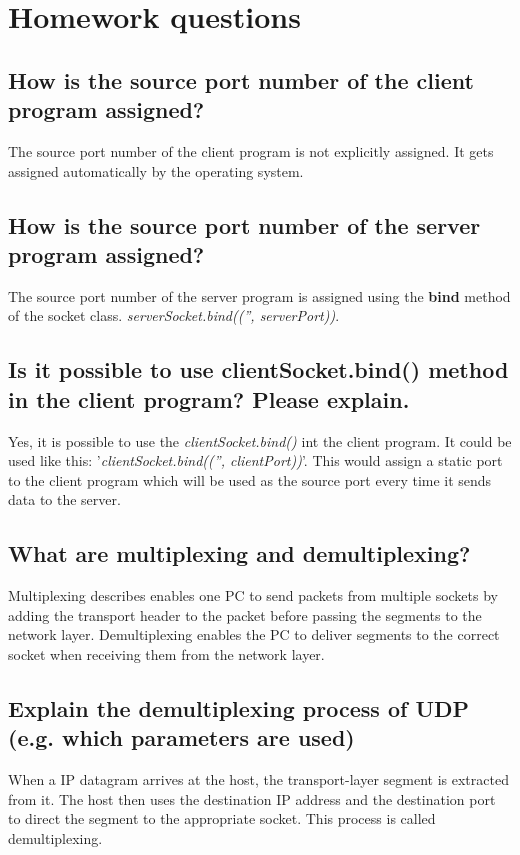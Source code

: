 \documentclass[a4paper,12pt]{article}
\begin{document}
\section{Homework questions}

\subsection{How is the source port number of the client program assigned?}
The source port number of the client program is not explicitly assigned.
It gets assigned automatically by the operating system.

\subsection{How is the source port number of the server program assigned?}
The source port number of the server program is assigned using the \textbf{bind} method of the socket class.
\textit{serverSocket.bind(('', serverPort))}.

\subsection{Is it possible to use clientSocket.bind() method in the client program? Please explain.}
Yes, it is possible to use the \textit{clientSocket.bind()} int the client program.
It could be used like this: '\textit{clientSocket.bind(('', clientPort))}'.
This would assign a static port to the client program which will be used as the source port every time it sends data to the server.

\subsection{What are multiplexing and demultiplexing?}
Multiplexing describes enables one PC to send packets from multiple sockets by adding the transport header to the packet before passing the segments to the network layer.
Demultiplexing enables the PC to deliver segments to the correct socket when receiving them from the network layer.

\subsection{Explain the demultiplexing process of UDP (e.g. which parameters are used)}
When a IP datagram arrives at the host, the transport-layer segment is extracted from it.
The host then uses the destination IP address and the destination port to direct the segment to the appropriate socket.
This process is called demultiplexing.
\end{document}
